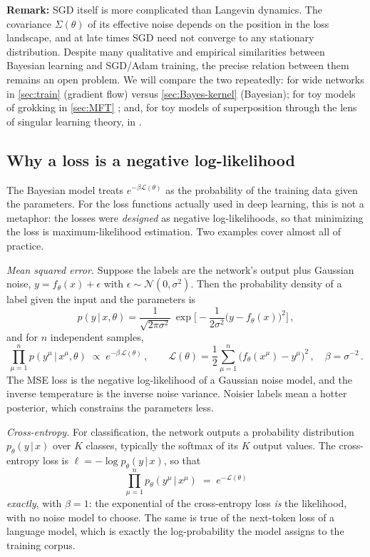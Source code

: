 \documentclass[11pt]{article}
\newcommand{\CN}{{\mathcal N}}
\newcommand{\CL}{{\mathcal L}}
\begin{document}
\smallskip
\textbf{Remark:} SGD itself is more complicated than Langevin dynamics. The covariance $\Sigma(\theta)$ of its effective noise depends on the position in the loss landscape, and at late times SGD need not converge to any stationary distribution. Despite many qualitative and empirical similarities between Bayesian learning and SGD/Adam training, the precise relation between them remains an open problem. We will compare the two repeatedly: for wide networks in \cref{sec:train} (gradient flow) versus \cref{sec:Bayes-kernel} (Bayesian); for toy models of grokking in \cref{sec:MFT} \cite{rubin2024grokking}; and, for toy models of superposition \cite{elhage2022superposition} through the lens of singular learning theory, in \cite{chen2023dynamical}.

\subsection{Why a loss is a negative log-likelihood}
\label{sec:loss-likelihood}

The Bayesian model treats $e^{-\beta\CL(\theta)}$ as the probability of the training data given the parameters. For the loss functions actually used in deep learning, this is not a metaphor: the losses were \emph{designed} as negative log-likelihoods, so that minimizing the loss is maximum-likelihood estimation. Two examples cover almost all of practice.

\emph{Mean squared error.} Suppose the labels are the network's output plus Gaussian noise, $y = f_\theta(x) + \epsilon$ with $\epsilon\sim\CN(0,\sigma^2)$. Then the probability density of a label given the input and the parameters is
%
\begin{equation}
    p(y\,|\,x,\theta) = \frac{1}{\sqrt{2\pi\sigma^2}}\,\exp\Big[-\frac{1}{2\sigma^2}\big(y-f_\theta(x)\big)^2\Big]\,,
\end{equation}
%
and for $n$ independent samples,
%
\begin{equation}
    \prod_{\mu=1}^n p(y^\mu\,|\,x^\mu,\theta) \;\propto\; e^{-\beta\,\CL(\theta)}\,,\qquad \CL(\theta) = \frac{1}{2}\sum_{\mu=1}^n\big(f_\theta(x^\mu)-y^\mu\big)^2\,,\quad \beta = \sigma^{-2}\,. \label{mse-likelihood}
\end{equation}
%
The MSE loss is the negative log-likelihood of a Gaussian noise model, and the inverse temperature is the inverse noise variance. Noisier labels mean a hotter posterior, which constrains the parameters less.

\emph{Cross-entropy.} For classification, the network outputs a probability distribution $p_\theta(y\,|\,x)$ over $K$ classes, typically the softmax of its $K$ output values. The cross-entropy loss is $\ell = -\log p_\theta(y\,|\,x)$, so that
%
\begin{equation}
    \prod_{\mu=1}^n p_\theta(y^\mu\,|\,x^\mu) \;=\; e^{-\CL(\theta)} \label{ce-likelihood}
\end{equation}
%
\emph{exactly}, with $\beta = 1$: the exponential of the cross-entropy loss \emph{is} the likelihood, with no noise model to choose. The same is true of the next-token loss of a language model, which is exactly the log-probability the model assigns to the training corpus.
\end{document}
